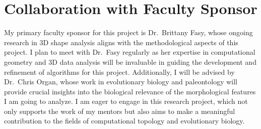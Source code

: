 \documentclass[12pt]{article}
\begin{document}
\section{Collaboration with Faculty Sponsor}
My primary faculty sponsor for this project is Dr.~Brittany Fasy, whose ongoing
research in 3D shape analysis aligns with the methodological aspects of this
project. I plan to meet with Dr.~Fasy regularly as her expertise in computational 
geometry and 3D data analysis will be invaluable in guiding the development and 
refinement of algorithms for this project. Additionally, I will be advised by
Dr.~Chris Organ, whose work in evolutionary biology and paleontology 
will provide crucial insights into the biological relevance of the morphological 
features I am going to analyze. I am eager to engage in this research project, 
which not only supports the work of my mentors but also aims to make a meaningful 
contribution to the fields of computational topology and evolutionary biology.

\newpage

 
\end{document}
